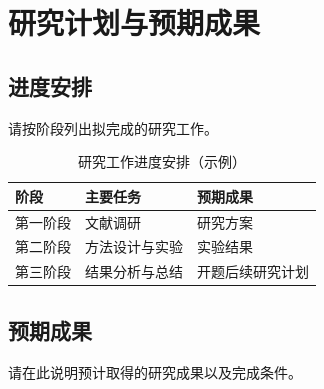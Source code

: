 \chapter{研究计划与预期成果}
\section{进度安排}
请按阶段列出拟完成的研究工作。
\begin{table}[htbp]
  \centering
  \caption{研究工作进度安排（示例）}
  \begin{tabular}{lll}
    \toprule
    阶段 & 主要任务 & 预期成果 \\
    \midrule
    第一阶段 & 文献调研 & 研究方案 \\
    第二阶段 & 方法设计与实验 & 实验结果 \\
    第三阶段 & 结果分析与总结 & 开题后续研究计划 \\
    \bottomrule
  \end{tabular}
\end{table}
\section{预期成果}
请在此说明预计取得的研究成果以及完成条件。
